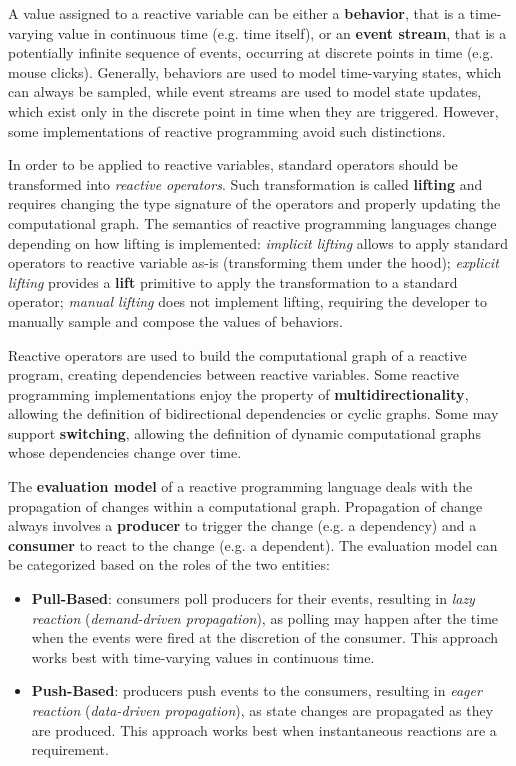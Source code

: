 A value assigned to a reactive variable can be either a \textbf{behavior}, that
is a time-varying value in continuous time (e.g. time itself), or an
\textbf{event stream}, that is a potentially infinite sequence of events,
occurring at discrete points in time (e.g. mouse clicks). Generally, behaviors
are used to model time-varying states, which can always be sampled, while event
streams are used to model state updates, which exist only in the discrete point
in time when they are triggered. However, some implementations of reactive
programming avoid such distinctions.

In order to be applied to reactive variables, standard operators should be
transformed into \textit{reactive operators}. Such transformation is called
\textbf{lifting} and requires changing the type signature of the operators and
properly updating the computational graph. The semantics of reactive
programming languages change depending on how lifting is implemented:
\textit{implicit lifting} allows to apply standard operators to reactive
variable as-is (transforming them under the hood); \textit{explicit lifting}
provides a \textbf{lift} primitive to apply the transformation to a standard
operator; \textit{manual lifting} does not implement lifting, requiring the
developer to manually sample and compose the values of behaviors.

Reactive operators are used to build the computational graph of a reactive
program, creating dependencies between reactive variables. Some reactive
programming implementations enjoy the property of \textbf{multidirectionality},
allowing the definition of bidirectional dependencies or cyclic graphs. Some
may support \textbf{switching}, allowing the definition of dynamic
computational graphs whose dependencies change over time.

The \textbf{evaluation model} of a reactive programming language deals with the
propagation of changes within a computational graph. Propagation of change
always involves a \textbf{producer} to trigger the change (e.g. a dependency)
and a \textbf{consumer} to react to the change (e.g. a dependent). The
evaluation model can be categorized based on the roles of the two entities:
\begin{itemize}
  \item \textbf{Pull-Based}: consumers poll producers for their events,
        resulting in \textit{lazy reaction} (\textit{demand-driven propagation}),
        as polling may happen after the time when the events were fired at the
        discretion of the consumer. This approach works best with time-varying
        values in continuous time.
  \item \textbf{Push-Based}: producers push events to the consumers, resulting
        in \textit{eager reaction} (\textit{data-driven propagation}), as state
        changes are propagated as they are produced. This approach works best
        when instantaneous reactions are a requirement.
\end{itemize}

